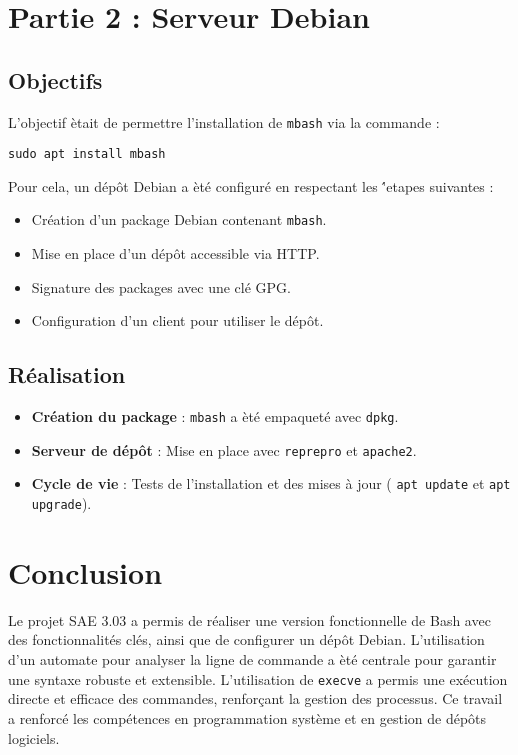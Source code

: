 \documentclass[11pt,a4paper]{article}
\begin{document}
\section{Partie 2 : Serveur Debian}

\subsection{Objectifs}

L'objectif \`etait de permettre l'installation de \texttt{mbash} via la commande :
\begin{verbatim}
sudo apt install mbash
\end{verbatim}

Pour cela, un d\'ep\^ot Debian a \`et\'e configur\'e en respectant les \''etapes suivantes :
\begin{itemize}
    \item Cr\'eation d'un package Debian contenant \texttt{mbash}.
    \item Mise en place d'un d\'ep\^ot accessible via HTTP.
    \item Signature des packages avec une cl\'e GPG.
    \item Configuration d'un client pour utiliser le d\'ep\^ot.
\end{itemize}

\subsection{R\'ealisation}

\begin{itemize}
    \item \textbf{Cr\'eation du package} : \texttt{mbash} a \`et\'e empaquet\'e avec \texttt{dpkg}.
    \item \textbf{Serveur de d\'ep\^ot} : Mise en place avec \texttt{reprepro} et \texttt{apache2}.
    \item \textbf{Cycle de vie} : Tests de l'installation et des mises \`a jour (
\texttt{apt update} et \texttt{apt upgrade}).
\end{itemize}

\section{Conclusion}

Le projet SAE 3.03 a permis de r\'ealiser une version fonctionnelle de Bash avec des fonctionnalit\'es cl\'es, ainsi que de configurer un d\'ep\^ot Debian. L'utilisation d'un automate pour analyser la ligne de commande a \`et\'e centrale pour garantir une syntaxe robuste et extensible. L'utilisation de \texttt{execve} a permis une ex\'ecution directe et efficace des commandes, renfor\c{c}ant la gestion des processus. Ce travail a renforc\'e les comp\'etences en programmation syst\`eme et en gestion de d\'ep\^ots logiciels.
\end{document}

